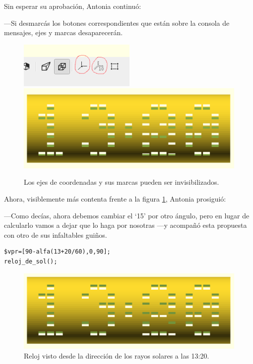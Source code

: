 Sin esperar su aprobación, Antonia continuó:

---Si desmarcás los botones correspondientes que están sobre la
consola de mensajes, ejes y marcas desaparecerán.


\begin{figure}[ht]
  \centering
  \includegraphics[width=.34\textwidth,valign=c]{imagenes/ejes-marcas}\hfill
  \includegraphics[width=.64\textwidth,valign=c]{imagenes/13_00b}
  \caption{Los ejes de coordenadas y sus marcas pueden ser invisibilizados.}
  \label{fig:ejes-invisibles}
\end{figure}


Ahora, visiblemente más contenta frente a la figura
\ref{fig:ejes-invisibles}, Antonia prosiguió:

---Como decías, ahora debemos cambiar el `15' por otro ángulo, pero en
lugar de calcularlo vamos a dejar que \openscad{} lo haga por nosotras
---y acompañó esta propuesta con otro de sus infaltables guiños.


\begin{lstlisting}
$vpr=[90-alfa(13+20/60),0,90];
reloj_de_sol();
\end{lstlisting}%

\begin{figure}[ht]
  \centering
  \includegraphics[width=.75\textwidth]{imagenes/vpr_13_20}  
  \caption{Reloj visto desde la dirección de los rayos solares a las
    13:20.}
  \label{fig:vpr_13_20}
\end{figure}

